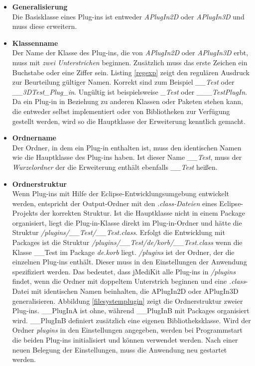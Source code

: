 \begin{itemize}
\item \textbf{Generalisierung}\\
Die Basisklasse eines Plug-ins ist entweder \textit{APlugIn2D} oder \textit{APlugIn3D} und muss diese erweitern. 
\item \textbf{Klassenname}\\
Der Name der Klasse des Plug-ins, die von \textit{APlugIn2D} oder \textit{APlugIn3D} erbt, muss mit \textit{zwei Unterstrichen} beginnen. Zusätzlich muss das erste Zeichen ein Buchstabe oder eine Ziffer sein. Listing \ref{regexp} zeigt den regulären Ausdruck zur Beurteilung gültiger Namen. Korrekt sind zum Beispiel \textit{\_\_Test} oder \textit{\_\_3DTest\_Plug\_in}. Ungültig ist beispielsweise \textit{\_Test} oder \textit{\_\_\_TestPlugIn}.
Da ein Plug-in in Beziehung zu anderen Klassen oder Paketen stehen kann, die entweder selbst implementiert oder von Bibliotheken zur Verfügung gestellt werden, wird so die Hauptklasse der Erweiterung kenntlich gemacht.
\item \textbf{Ordnername}\\
Der Ordner, in dem ein Plug-in enthalten ist, muss den identischen Namen wie die Hauptklasse des Plug-ins haben. Ist dieser Name \textit{\_\_Test}, muss der \textit{Wurzelordner} der die Erweiterung enthält ebenfalls \textit{\_\_Test} heißen.
\item \textbf{Ordnerstruktur}\\
Wenn Plug-ins mit Hilfe der Eclipse-Entwicklungsumgebung entwickelt werden, entspricht der Output-Ordner mit den \textit{.class-Dateien} eines Eclipse-Projekts der korrekten Struktur. Ist die Hauptklasse nicht in einem Package organisiert, liegt die Plug-in-Klasse direkt im Plug-in-Ordner und hätte die Struktur \textit{/plugins/\_\_Test/\_\_Test.class}. Erfolgt die Entwicklung mit Packages ist die Struktur \textit{/plugins/\_\_Test/de/korb/\_\_Test.class} wenn die Klasse \_\_Test im Package \textit{de.korb} liegt. \textit{/plugins} ist der Ordner, der die einzelnen Plug-ins enthält. Dieser muss in den Einstellungen der Anwendung spezifiziert werden. Das bedeutet, dass jMediKit alle Plug-ins in \textit{/plugins} findet, wenn die Ordner mit doppeltem Unterstrich beginnen und eine \textit{.class}-Datei mit identischen Namen beinhalten, die APlugIn2D oder APlugIn3D generalisieren. Abbildung \ref{filesystemplugin} zeigt die Ordnerstruktur zweier Plug-ins. \_\_PlugInA ist ohne, während \_\_PlugInB mit Packages organisiert wird. \_\_PlugInB definiert zusätzlich eine eigenen Bibliotheksklasse. Wird der Ordner \textit{plugins} in den Einstellungen angegeben, werden bei Programmstart die beiden Plug-ins initialisiert und können verwendet werden. Nach einer neuen Belegung der Einstellungen, muss die Anwendung neu gestartet werden.
\end{itemize}

